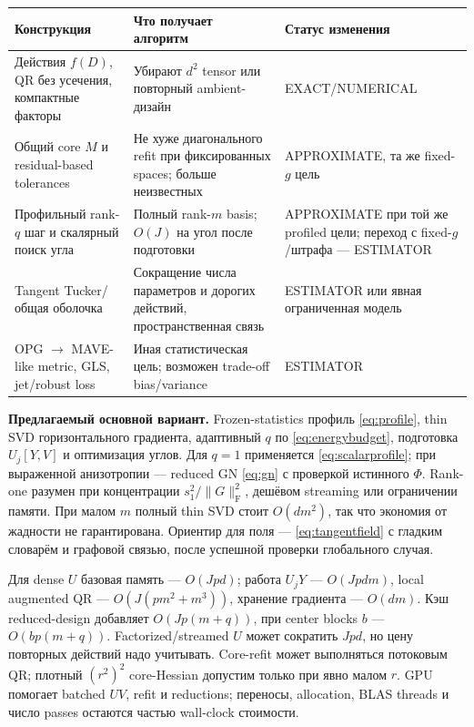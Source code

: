 \documentclass[11pt,a4paper]{article}
\newcommand{\F}{_{\mathrm F}}
\begin{document}
\begin{center}\small
\begin{tabularx}{\linewidth}{@{}p{29mm}LL@{}}
\toprule
Конструкция & Что получает алгоритм & Статус изменения\\
\midrule
Действия $f(D)$, QR без усечения, компактные факторы &
Убирают $d^2$ tensor или повторный ambient-дизайн & EXACT/NUMERICAL\\
Общий core $M$ и residual-based tolerances &
Не хуже диагонального refit при фиксированных spaces; больше неизвестных &
APPROXIMATE, та же fixed-$g$ цель\\
Профильный rank-$q$ шаг и скалярный поиск угла &
Полный rank-$m$ basis; $O(J)$ на угол после подготовки &
APPROXIMATE при той же profiled цели; переход с fixed-$g$/штрафа --- ESTIMATOR\\
Tangent Tucker/общая оболочка &
Сокращение числа параметров и дорогих действий, пространственная связь &
ESTIMATOR или явная ограниченная модель\\
OPG $\to$ MAVE-like metric, GLS, jet/robust loss &
Иная статистическая цель; возможен trade-off bias/variance & ESTIMATOR\\
\bottomrule
\end{tabularx}
\end{center}

\textbf{Предлагаемый основной вариант.} Frozen-statistics профиль
\eqref{eq:profile}, thin SVD горизонтального градиента, адаптивный $q$
по \eqref{eq:energybudget}, подготовка $U_j[Y,V]$ и оптимизация углов.
Для $q=1$ применяется \eqref{eq:scalarprofile}; при выраженной
анизотропии --- reduced GN \eqref{eq:gn} с проверкой истинного $\Phi$.
Rank-one разумен при концентрации $s_1^2/\|G\|\F^2$, дешёвом streaming
или ограничении памяти. При малом $m$ полный thin SVD стоит $O(dm^2)$,
так что экономия от жадности не гарантирована.
Ориентир для поля --- \eqref{eq:tangentfield} с гладким словарём и
графовой связью, после успешной проверки глобального случая.

Для dense $U$ базовая память --- $O(Jpd)$; работа $U_jY$ ---
$O(Jpdm)$, local augmented QR --- $O(J(pm^2+m^3))$, хранение градиента ---
$O(dm)$. Кэш reduced-design добавляет $O(Jp(m+q))$,
при center blocks $b$ --- $O(bp(m+q))$.
Factorized/streamed $U$ может сократить $Jpd$, но цену повторных
действий надо учитывать. Core-refit может выполняться потоковым QR;
плотный $(r^2)^2$ core-Hessian допустим только при явно малом $r$.
GPU помогает batched $U V$, refit и reductions; переносы, allocation,
BLAS threads и число passes остаются частью wall-clock стоимости.
\end{document}
